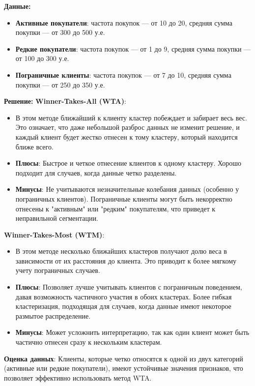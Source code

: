 \textbf{Данные:}
\begin{itemize}
    \item \textbf{Активные покупатели}: частота покупок — от 10 до 20, средняя сумма покупки — от 300 до 500 у.е.
    \item \textbf{Редкие покупатели}: частота покупок — от 1 до 9, средняя сумма покупки — от 100 до 300 у.е.
    \item \textbf{Пограничные клиенты}: частота покупок — от 7 до 10, средняя сумма покупки — от 250 до 350 у.е.
\end{itemize}

\textbf{Решение:}
\textbf{Winner-Takes-All (WTA)}:
\begin{itemize}
    \item В этом методе ближайший к клиенту кластер побеждает и забирает весь вес. Это означает, что даже небольшой разброс данных не изменит решение, и каждый клиент будет жестко отнесен к тому кластеру, который находится ближе всего.
    \item \textbf{Плюсы}: Быстрое и четкое отнесение клиентов к одному кластеру. Хорошо подходит для случаев, когда данные четко разделены.
    \item \textbf{Минусы}: Не учитываются незначительные колебания данных (особенно у пограничных клиентов). Пограничные клиенты могут быть некорректно отнесены к "активным" или "редким" покупателям, что приведет к неправильной сегментации.
\end{itemize}

\textbf{Winner-Takes-Most (WTM)}:
\begin{itemize}
    \item В этом методе несколько ближайших кластеров получают долю веса в зависимости от их расстояния до клиента. Это приводит к более мягкому учету пограничных случаев.
    \item \textbf{Плюсы}: Позволяет лучше учитывать клиентов с пограничным поведением, давая возможность частичного участия в обоих кластерах. Более гибкая кластеризация, подходящая для случаев, когда данные имеют некоторое размытое распределение.
    \item \textbf{Минусы}: Может усложнить интерпретацию, так как один клиент может быть частично отнесен сразу к нескольким кластерам.
\end{itemize}

\textbf{Оценка данных}: 
Клиенты, которые четко относятся к одной из двух категорий (активные или редкие покупатели), имеют устойчивые значения признаков, что позволяет эффективно использовать метод WTA. 

